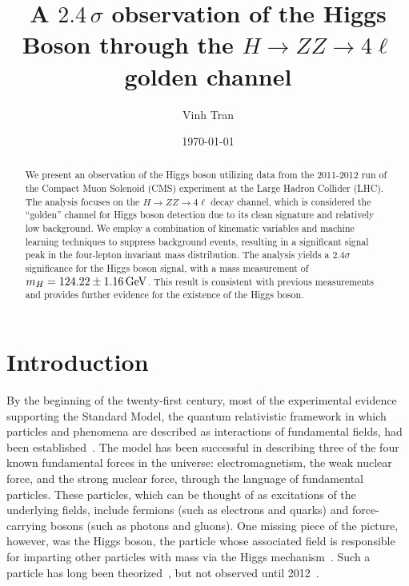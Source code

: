\documentclass[aps,twocolumn,secnumarabic,balancelastpage,amsmath,amssymb,nofootinbib,floatfix]{revtex4-1}
\newcommand{\GeV}{\,{\rm GeV}}
\begin{document}
\title{A $2.4 \, \sigma$ observation of the Higgs Boson through the $H \to ZZ \to 4\ell$ golden channel}

\author{Vinh Tran}

\date{\today}


\begin{abstract}

We present an observation of the Higgs boson utilizing data from the 2011-2012 run of the Compact Muon Solenoid (CMS) experiment at the Large Hadron Collider (LHC). The analysis focuses on the $H \to ZZ \to 4\ell$ decay channel, which is considered the ``golden'' channel for Higgs boson detection due to its clean signature and relatively low background. We employ a combination of kinematic variables and machine learning techniques to suppress background events, resulting in a significant signal peak in the four-lepton invariant mass distribution. The analysis yields a $2.4 \sigma$ significance for the Higgs boson signal, with a mass measurement of $m_H = 124.22 \pm 1.16 \GeV$. This result is consistent with previous measurements and provides further evidence for the existence of the Higgs boson.

\end{abstract}

\maketitle


\section{Introduction}
\label{sec:intro}

By the beginning of the twenty-first century, most of the experimental evidence supporting the Standard Model, the quantum relativistic framework in which particles and phenomena are described as interactions of fundamental fields, had been established~\citep[e.g.][]{UA11983,D01995,DONUT2001}. The model has been successful in describing three of the four known fundamental forces in the universe: electromagnetism, the weak nuclear force, and the strong nuclear force, through the language of fundamental particles. These particles, which can be thought of as excitations of the underlying fields, include fermions (such as electrons and quarks) and force-carrying bosons (such as photons and gluons). One missing piece of the picture, however, was the Higgs boson, the particle whose associated field is responsible for imparting other particles with mass via the Higgs mechanism~\citep{Weinberg1995}. Such a particle has long been theorized~\citep{Higgs1964}, but not observed until 2012~\citep{CMS2012}.
\end{document}
